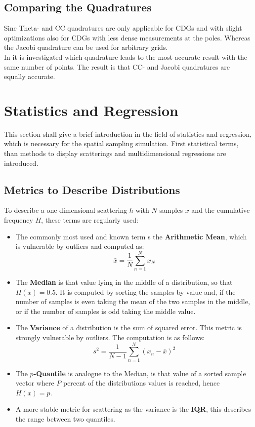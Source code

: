 \subsection{Comparing the Quadratures}

Sine Theta- and \ac{CC} quadratures are only applicable for \acp{CDG} and with slight optimizations also for \acp{CDG} with less dense measurements at the poles. Whereas the Jacobi quadrature can be used for arbitrary grids.\\
In \cite{trp2} it is investigated which quadrature leads to the most accurate result with the same number of points. The result is that \ac{CC}- and Jacobi quadratures are equally accurate.

\section{Statistics and Regression}

This section shall give a brief introduction in the field of statistics and regression, which is necessary for the spatial sampling simulation. First statistical terms, than methods to display scatterings and multidimensional regressions are introduced.

\subsection{Metrics to Describe Distributions}

To describe a one dimensional scattering $h$ with $N$ samples $x$ and the cumulative frequency $H$, these terms are regularly used: \cite{dffs}

\begin{itemize}
\item The commonly most used and known term s the \textbf{Arithmetic Mean}, which is vulnerable by outliers and computed as:
\begin{equation}
\bar x = \frac{1}{N}\sum_{n=1}^N x_N
\end{equation}
\item The \textbf{Median} is that value lying in the middle of a distribution, so that $H\left( x\right) = 0.5$. It is computed by sorting the samples by value and, if the number of samples is even taking the mean of the two samples in the middle, or if the number of samples is odd taking the middle value.
\item The \textbf{Variance} of a distribution is the sum of squared error. This metric is strongly vulnerable by outliers. The computation is as follows:
\begin{equation}
s^2 = \frac{1}{N-1}\sum_{n=1}^N\left( x_n-\bar{x}\right)^2
\end{equation}
\item The \textbf{$p$-Quantile} is analogue to the Median, is that value of a sorted sample vector where $P$ percent of the distributions values is reached, hence $H\left( x\right) = p$.
\item A more stable metric for scattering as the variance is the \textbf{\ac{IQR}}, this describes the range between two quantiles.
\end{itemize}

